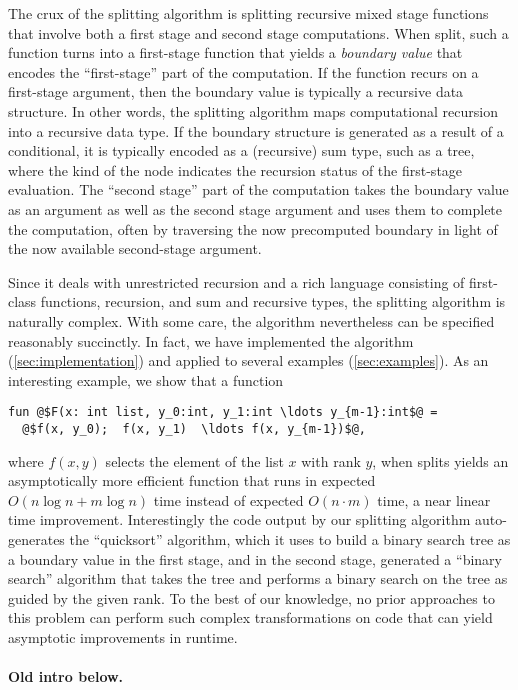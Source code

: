 The crux of the splitting algorithm is splitting recursive mixed stage
functions that involve both a first stage and second stage
computations.  When split, such a function turns into a first-stage
function that yields a {\em boundary value} that encodes the
``first-stage'' part of the computation.  If the function recurs on a
first-stage argument, then the boundary value is typically a recursive
data structure.  In other words, the splitting algorithm maps
computational recursion into a recursive data type. If the boundary
structure is generated as a result of a conditional, it is typically
encoded as a (recursive) sum type, such as a tree, where the kind of
the node indicates the recursion status of the first-stage evaluation.
The ``second stage'' part of the computation takes the boundary value
as an argument as well as the second stage argument and uses them to
complete the computation, often by traversing the now precomputed
boundary in light of the now available second-stage argument.

Since it deals with unrestricted recursion and a rich language
consisting of first-class functions, recursion, and sum and recursive
types, the splitting algorithm is naturally complex. With some care,
the algorithm nevertheless can be specified reasonably succinctly.  In
fact, we have implemented the algorithm (\ref{sec:implementation}) and
applied to several examples (\ref{sec:examples}).  As an interesting
example, we show that a function 
\begin{lstlisting}
fun @$F(x: int list, y_0:int, y_1:int \ldots y_{m-1}:int$@ = 
  @$f(x, y_0);  f(x, y_1)  \ldots f(x, y_{m-1})$@,
\end{lstlisting}
where $f(x,y)$ selects the element of the list $x$ with rank $y$, when
splits yields an asymptotically more efficient function that runs in
expected $O(n\log{n} + m\log{n})$ time instead of expected $O(n \cdot
m)$ time, a near linear time improvement.  Interestingly the code
output by our splitting algorithm auto-generates the ``quicksort''
algorithm, which it uses to build a binary search tree as a boundary
value in the first stage, and in the second stage, generated a
``binary search'' algorithm that takes the tree and performs a binary
search on the tree as guided by the given rank.  To the best of our
knowledge, no prior approaches to this problem can perform such
complex transformations on code that can yield asymptotic
improvements in runtime.


\paragraph{Old intro below.}

